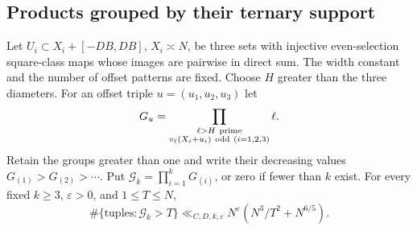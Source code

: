 \subsection{Products grouped by their ternary support}

\begin{proposition}\label{p1:arith:ternary-budget}
Let $U_i\subset X_i+[-DB,DB]$, $X_i\asymp N$, be three sets with
injective even-selection square-class maps whose images are pairwise
in direct sum.  The width constant and the number of offset patterns
are fixed.  Choose $H$ greater than the three diameters.  For an offset
triple $u=(u_1,u_2,u_3)$ let
\[
 G_u=\prod_{\substack{\ell>H\ {\rm prime}\\
       v_\ell(X_i+u_i)\ {\rm odd}\ (i=1,2,3)}}\ell.
\]
Retain the groups greater than one and write their decreasing values
$G_{(1)}>G_{(2)}>\cdots$.  Put
$\mathcal G_k=\prod_{i=1}^kG_{(i)}$, or zero if fewer than $k$ exist.
For every fixed $k\geq3$, $\varepsilon>0$, and $1\leq T\leq N$,
\begin{equation}\label{p1:arith:ternarycount}
 \#\{\text{tuples}:\mathcal G_k>T\}
 \ll_{C,D,k,\varepsilon}N^\varepsilon
      (N^3/T^2+N^{6/5}).
\end{equation}
\end{proposition}

